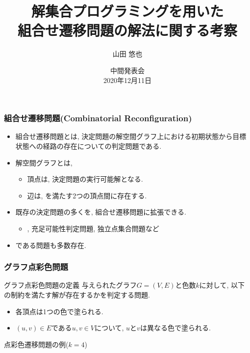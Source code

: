 \documentclass[dvipdfmx,11pt]{beamer}
\title[ASPを用いた組合せ遷移問題の解法に関する考察]{解集合プログラミングを用いた\\組合せ遷移問題の解法に関する考察}
\author{山田 悠也}
\date{中間発表会\\2020年12月11日}
\institute{番原研究室}
\begin{document}
\begin{frame}\frametitle{}
  \titlepage
\end{frame}

\begin{frame}\frametitle{組合せ遷移問題(Combinatorial Reconfiguration)}

  \begin{itemize}
    \item \alert{組合せ遷移問題}とは, 決定問題の解空間グラフ上における初期状態から目標状態への経路の存在についての判定問題である.
    \item \alert{解空間グラフ}とは,
    \begin{itemize}
      \item 頂点は, 決定問題の実行可能解となる.
      \item 辺は, を満たす2つの頂点間に存在する.
    \end{itemize} 
    \item 既存の決定問題の多くを, 組合せ遷移問題に拡張できる.
    \begin{itemize}
      \item {}, 充足可能性判定問題, 独立点集合問題など
    \end{itemize}
    \item {}である問題も多数存在.
  \end{itemize}

\end{frame}

\begin{frame}\frametitle{グラフ点彩色問題}
    
  \begin{block}{グラフ点彩色問題の定義}
    与えられたグラフ$G=(V, E)$と色数$k$に対して, 以下の制約を満たす解が存在するかを判定する問題.
    \begin{itemize}
      \item 各頂点は1つの色で塗られる.
      \item $(u, v) \in E$である$u, v \in V$について, $u$と$v$は異なる色で塗られる.
    \end{itemize}
  \end{block}
  
  \begin{exampleblock}{点彩色遷移問題の例($k=4$)}
    \begin{columns}
      \begin{column}{1.0\textwidth}
        \centering
        
      \end{column}
    \end{columns}
  \end{exampleblock}
  

\end{frame}
\end{document}
